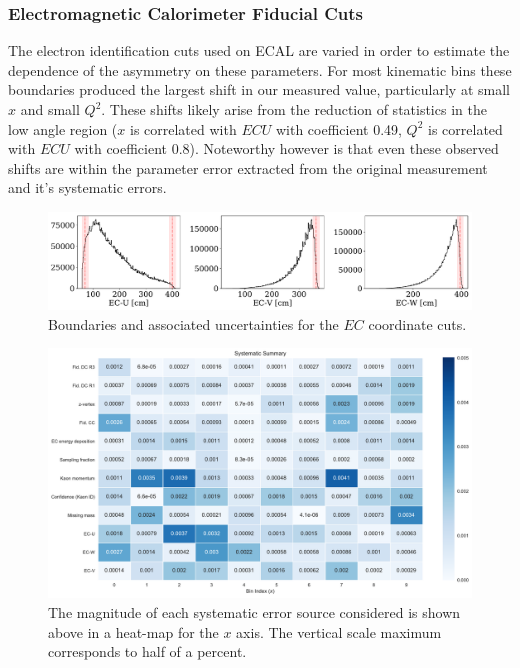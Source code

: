 \subsubsection*{Electromagnetic Calorimeter Fiducial Cuts}
The electron identification cuts used on ECAL are varied in order to estimate the dependence of the asymmetry on these parameters.  For most kinematic bins these boundaries produced the largest shift in our measured value, particularly at small $x$ and small $Q^2$.  These shifts likely arise from the reduction of statistics in the low angle region ($x$ is correlated with $ECU$ with coefficient 0.49, $Q^2$ is correlated with $ECU$ with coefficient 0.8).  Noteworthy however is that even these observed shifts are within the parameter error extracted from the original measurement and it's systematic errors.  

\begin{figure}
	\label{fig:ec_fid_sys}
	\begin{center}
		\includegraphics[width=14cm]{image/plots/kaon-bsa/ec-fid-sys.pdf}
		\caption{Boundaries and associated uncertainties for the $EC$ coordinate cuts.}
	\end{center}
\end{figure}

\begin{figure}
	\label{fig:systematic_heatmap_x}
	\begin{center}
		\includegraphics[width=14cm]{image/plots/kaon-bsa/systematics_integrated_heatmap_x.pdf}
		\caption{The magnitude of each systematic error source considered is shown above in a heat-map for the $x$ axis.  The vertical scale maximum corresponds to half of a percent.}
	\end{center}
\end{figure}

